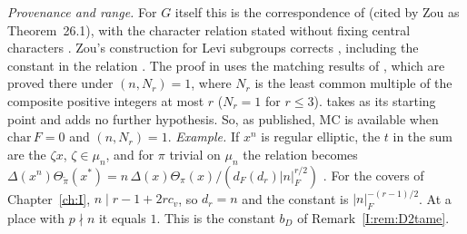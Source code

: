 \begin{description}
\emph{Provenance and range.} For $G$ itself this is the correspondence of \cite[\S26, Theorem]{FK86} (cited by Zou as Theorem~26.1), with the character relation stated without fixing central characters \cite[Remark~3.1]{Zo23}. Zou's construction for Levi subgroups corrects \cite[\S26.2]{FK86}, including the constant in the relation \cite[Remark~3.8]{Zo23}. The proof in \cite{FK86} uses the matching results of \cite[\S12, Corollary; \S13, Theorem]{FK86}, which are proved there under $(n,N_r)=1$, where $N_r$ is the least common multiple of the composite positive integers at most $r$ ($N_r=1$ for $r\le3$). \cite{Zo23} takes \cite[\S26]{FK86} as its starting point and adds no further hypothesis. So, as published, $\mathrm{MC}$ is available when $\mathrm{char}\,F=0$ and $(n,N_r)=1$.
\emph{Example.} If $x^n$ is regular elliptic, the $t$ in the sum are the $\zeta x$, $\zeta\in\mu_n$, and for $\pi$ trivial on $\mu_n$ the relation becomes $\Delta(x^n)\Theta_{\widetilde\pi}(x^*)=n\,\Delta(x)\Theta_\pi(x)/(d_F(d_r)|n|_F^{r/2})$ \cite[Remark~3.3]{Zo23}. For the covers of Chapter~\ref{ch:I}, $n\mid r-1+2rc_v$, so $d_r=n$ and the constant is $|n|_F^{-(r-1)/2}$. At a place with $p\nmid n$ it equals $1$. This is the constant $b_D$ of Remark~\ref{I:rem:D2tame}.
\end{description}

